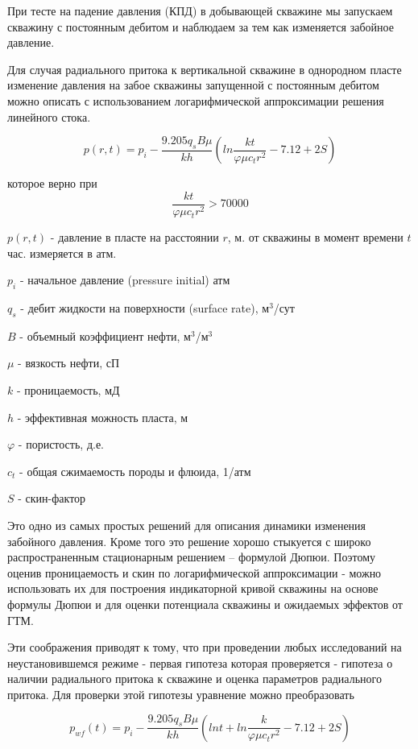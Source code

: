 При тесте на падение давления (КПД) в добывающей скважине мы запускаем скважину с постоянным дебитом и наблюдаем за тем как изменяется забойное давление.

Для случая радиального притока к вертикальной скважине в однородном пласте изменение давления на забое скважины запущенной с постоянным дебитом можно описать с использованием логарифмической аппроксимации решения линейного стока.

\begin{equation}
 p\left(r,t\right)=p_i-\frac{9.205q_s B\mu}{kh} \left(ln{\frac{kt}{\varphi\mu c_t r^2}}-7.12 +2S\right)    
\end{equation}

которое верно при 
$$\frac{kt}{\varphi\mu c_tr^2}>70000 $$

$p(r,t)$ - давление в пласте на расстоянии $r$, м. от скважины в момент времени $t$ час. измеряется в атм.

$p_i$ - начальное давление (pressure initial) атм

$q_s$ - дебит жидкости на поверхности (surface rate), м$^3$/сут 

$B$ - объемный коэффициент нефти, м$^3$/м$^3$

$\mu$ - вязкость нефти, сП

$k$ - проницаемость, мД

$h$ - эффективная можность пласта, м

$\varphi$ - пористость, д.е.

$c_t$ - общая сжимаемость породы и флюида, 1/атм

$S$ - скин-фактор


Это одно из самых простых решений для описания динамики изменения забойного давления. Кроме того это решение хорошо стыкуется с широко распространенным стационарным решением -- формулой Дюпюи. Поэтому оценив проницаемость и скин по логарифмической аппроксимации - можно использовать их для построения индикаторной кривой скважины на основе формулы Дюпюи и для оценки потенциала скважины и ожидаемых эффектов от ГТМ. 

Эти соображения приводят к тому, что при проведении любых исследований на неустановившемся режиме - первая гипотеза которая проверяется - гипотеза о наличии радиального притока к скважине и оценка параметров радиального притока.  
Для проверки этой гипотезы уравнение можно преобразовать 

$$ p_{wf}\left(t\right)=p_i-\frac{9.205q_sB\mu}{kh}\left( ln{t} + ln{\frac{k}{\varphi\mu c_tr^2} }-7.12 + 2S\right)$$

